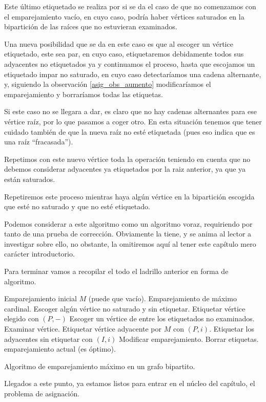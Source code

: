Este último etiquetado se realiza por si se da el caso de que no comenzamos con el emparejamiento vacío, en cuyo caso, podría haber vértices saturados en la bipartición de las raíces que no estuvieran examinados.

Una nueva posibilidad que se da en este caso es que al escoger un vértice etiquetado, este sea par, en cuyo caso, etiquetaremos debidamente todos sus adyacentes no etiquetados ya y continuamos el proceso, hasta que escojamos un etiquetado impar no saturado, en cuyo caso detectaríamos una cadena alternante, y, siguiendo la observación \ref{asig_obs_aumento} modificaríamos el emparejamiento y borraríamos todas las etiquetas.

Si este caso no se llegara a dar, es claro que no hay cadenas alternantes para ese vértice raíz, por lo que pasamos a coger otro. En esta situación tenemos que tener cuidado también de que la nueva raíz no esté etiquetada (pues eso indica que es una raíz ``fracasada'').

Repetimos con este nuevo vértice toda la operación teniendo en cuenta que no debemos considerar adyacentes ya etiquetados por la raiz anterior, ya que ya están saturados.

Repetiremos este proceso mientras haya algún vértice en la bipartición escogida que esté no saturado y que no esté etiquetado.
\begin{obs}[Voraz]
	Podemos considerar a este algoritmo como un algoritmo voraz, requiriendo por tanto de una prueba de corrección. Obviamente la tiene, y se anima al lector a investigar sobre ello, no obstante, la omitiremos aquí al tener este capítulo mero carácter introductorio.
\end{obs}
Para terminar vamos a recopilar el todo el ladrillo anterior en forma de algoritmo.
\begin{algorithm}[H]
	\begin{algorithmic}[1]
		\REQUIRE Emparejamiento inicial $M$ (puede que vacío).
		\ENSURE Emparejamiento de máximo cardinal.
		\REPEAT
		\STATE Escoger algún vértice no saturado y sin etiquetar.
		\STATE Etiquetar vértice elegido con $(P,-)$
		\REPEAT
		\STATE Escoger un vértice de entre los etiquetados no examinados.
		\STATE Examinar vértice.
		\STATE Etiquetar vértice adyacente por $M$ con $(P,i)$. 
		\STATE Etiquetar los adyacentes sin etiquetar con $(I,i)$
		\ENDIF
		\STATE Modificar emparejamiento.
		\STATE Borrar etiquetas.
		\ENDIF
		\RETURN emparejamiento actual (es óptimo).
	\end{algorithmic}
	\caption{Algoritmo de emparejamiento máximo en un grafo bipartito.}\label{asig_alg_empMax}
\end{algorithm}
Llegados a este punto, ya estamos listos para entrar en el núcleo del capítulo, el problema de asignación.
